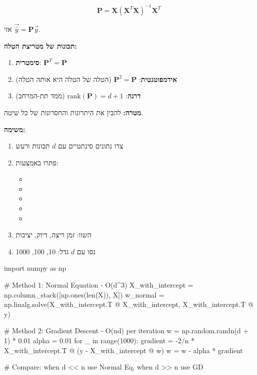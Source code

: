 \begin{equation}
\mathbf{P} = \mathbf{X}(\mathbf{X}^T\mathbf{X})^{-1}\mathbf{X}^T
\end{equation}

אזי $\vec{\hat{y}} = \mathbf{P}\vec{y}$.

\textbf{תכונות של מטריצת הטלה:}

\begin{enumerate}
\item \textbf{סימטרית}: $\mathbf{P}^T = \mathbf{P}$
\item \textbf{אידמפוטנטית}: $\mathbf{P}^2 = \mathbf{P}$ (הטלה של הטלה היא אותה הטלה)
\item \textbf{דרגה}: $\text{rank}(\mathbf{P}) = d+1$ (ממד תת-המרחב)
\end{enumerate}


\textbf{מטרה:} להבין את היתרונות והחסרונות של כל שיטה.

\textbf{משימה:}

\begin{enumerate}
\item צרו נתונים סינתטיים עם $d$ תכונות ורעש
\item פתרו באמצעות:
\begin{itemize}
\item {}
\item {}
\item {}
\item {}
\item {}
\end{itemize}
\item השוו: זמן ריצה, דיוק, יציבות
\item נסו עם $d$ גדל: \num{10}, \num{100}, \num{1000}
\end{enumerate}

\begin{pythonbox*}
import numpy as np

# Method 1: Normal Equation - O(d^3)
X_with_intercept = np.column_stack([np.ones(len(X)), X])
w_normal = np.linalg.solve(X_with_intercept.T @ X_with_intercept,
                           X_with_intercept.T @ y)

# Method 2: Gradient Descent - O(nd) per iteration
w = np.random.randn(d + 1) * 0.01
alpha = 0.01
for _ in range(1000):
    gradient = -2/n * X_with_intercept.T @ (y - X_with_intercept @ w)
    w = w - alpha * gradient

# Compare: when d << n use Normal Eq, when d >> n use GD
\end{pythonbox*}


